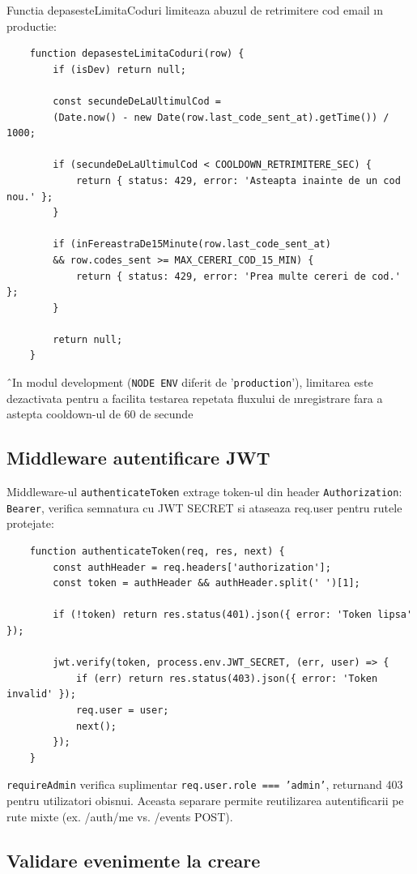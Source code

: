 Functia depasesteLimitaCoduri limiteaza abuzul de retrimitere cod email ın productie:

\begin{lstlisting}
	function depasesteLimitaCoduri(row) {
		if (isDev) return null;
		
		const secundeDeLaUltimulCod =
		(Date.now() - new Date(row.last_code_sent_at).getTime()) / 1000;
		
		if (secundeDeLaUltimulCod < COOLDOWN_RETRIMITERE_SEC) {
			return { status: 429, error: 'Asteapta inainte de un cod nou.' };
		}
		
		if (inFereastraDe15Minute(row.last_code_sent_at)
		&& row.codes_sent >= MAX_CERERI_COD_15_MIN) {
			return { status: 429, error: 'Prea multe cereri de cod.' };
		}
		
		return null;
	}
\end{lstlisting}

ˆIn modul development ({\tt NODE ENV} diferit de ’{\tt production}’), limitarea este dezactivata pentru a facilita testarea repetata fluxului de ınregistrare fara a astepta cooldown-ul de 60 de secunde

\subsection{Middleware autentificare JWT}

Middleware-ul {\tt authenticateToken} extrage token-ul din header {\tt Authorization}: {\tt Bearer}, verifica semnatura cu JWT SECRET si ataseaza req.user pentru rutele protejate:

\begin{lstlisting}
	function authenticateToken(req, res, next) {
		const authHeader = req.headers['authorization'];
		const token = authHeader && authHeader.split(' ')[1];
		
		if (!token) return res.status(401).json({ error: 'Token lipsa' });
		
		jwt.verify(token, process.env.JWT_SECRET, (err, user) => {
			if (err) return res.status(403).json({ error: 'Token invalid' });
			req.user = user;
			next();
		});
	}
\end{lstlisting}

{\tt requireAdmin} verifica suplimentar {\tt req.user.role === ’admin’}, returnand 403 pentru utilizatori obisnui. Aceasta separare permite reutilizarea autentificarii pe rute mixte (ex. /auth/me vs. /events POST).

\subsection{Validare evenimente la creare}

